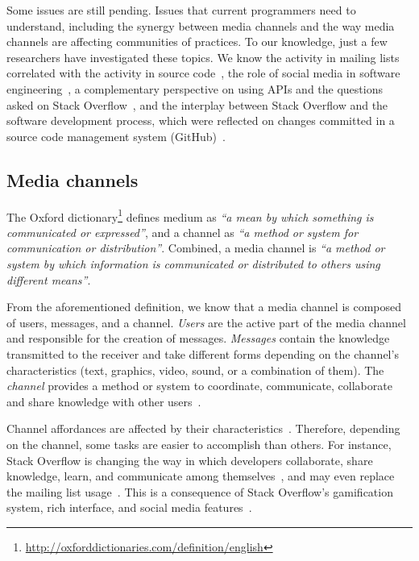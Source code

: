 \documentclass{sig-alternate-05-2015}
\begin{document}
	Some issues are still pending.
	Issues that current programmers need to understand, including the synergy between media channels and the way media channels are affecting communities of practices.
	To our knowledge, just a few researchers have investigated these topics.
	We know the activity in mailing lists correlated with the activity in source code~\cite{Bird2006}, the role of social media in software engineering~\cite{Storey2014, Storey2010}, a complementary perspective on using APIs and the questions asked on Stack Overflow~\cite{Kavaler2013}, and the interplay between Stack Overflow and the software development process, which were reflected on changes committed in a source code management system (GitHub)~\cite{Vasilescu2013a}.

\subsection{Media channels}

	The Oxford dictionary\footnote{\url{http://oxforddictionaries.com/definition/english}} defines medium as \textit{``a mean by which something is communicated or expressed''}, and a channel as \textit{``a method or system for communication or distribution''}.
	Combined, a media channel is \textit{``a method or system by which information is communicated or distributed to others using different means''}.

	From the aforementioned definition, we know that a media channel is composed of users, messages, and a channel. 
	\textit{Users} are the active part of the media channel and responsible for the creation of messages.
	\textit{Messages} contain the knowledge transmitted to the receiver and take different forms depending on the channel's characteristics (text, graphics, video, sound, or a combination of them).
	The \textit{channel} provides a method or system to coordinate, communicate, collaborate and share knowledge with other users~\cite{Storey2014}.

    Channel affordances are affected by their characteristics~\cite{Storey2014}.
	Therefore, depending on the channel, some tasks are easier to accomplish than others.
	For instance, Stack Overflow is changing the way in which developers collaborate, share knowledge, learn, and communicate among themselves~\cite{Storey2014}, and may even replace the mailing list usage~\cite{Vasilescu2014b}.
	This is a consequence of Stack Overflow's gamification system, rich interface, and social media features~\cite{Vasilescu2014b}.
\end{document}
